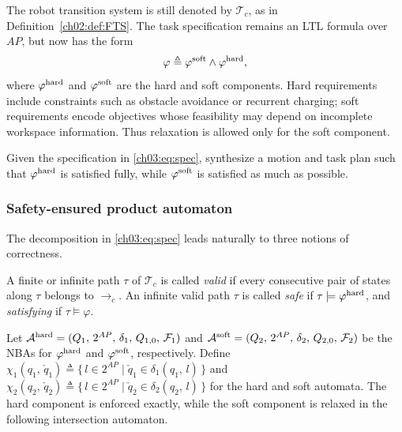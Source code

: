 The robot transition system is still denoted by $\mathcal{T}_c$, as in
Definition~\ref{ch02:def:FTS}. The task specification remains an LTL formula
over $AP$, but now has the form
\begin{equation}
\varphi \triangleq \varphi^{\textup{soft}} \wedge \varphi^{\textup{hard}},
\label{ch03:eq:spec}
\end{equation}
where $\varphi^{\textup{hard}}$ and $\varphi^{\textup{soft}}$ are the hard and
soft components. Hard requirements include constraints such as obstacle
avoidance or recurrent charging; soft requirements encode objectives whose
feasibility may depend on incomplete workspace information. Thus relaxation is
allowed only for the soft component.

\begin{problem}
Given the specification in \eqref{ch03:eq:spec}, synthesize a motion and task
plan such that $\varphi^{\textup{hard}}$ is satisfied fully, while
$\varphi^{\textup{soft}}$ is satisfied as much as possible.
\end{problem}

\subsubsection{Safety-ensured product automaton}
\label{ch03:subsec:intersection}

The decomposition in \eqref{ch03:eq:spec} leads naturally to three notions of
correctness.

\begin{definition}\label{ch03:def:vs}
A finite or infinite path $\tau$ of $\mathcal{T}_c$ is called \emph{valid}
if every consecutive pair of states along $\tau$ belongs to
$\longrightarrow_c$. An infinite valid path $\tau$ is called \emph{safe} if
$\tau \models \varphi^{\textup{hard}}$, and \emph{satisfying} if
$\tau \models \varphi$.
\end{definition}

Let
$\mathcal{A}^{\textup{hard}}
= (Q_1,\, 2^{AP},\, \delta_1,\, Q_{1,0},\, \mathcal{F}_1)$ and
$\mathcal{A}^{\textup{soft}}
= (Q_2,\, 2^{AP},\, \delta_2,\, Q_{2,0},\, \mathcal{F}_2)$ be the NBAs for
$\varphi^{\textup{hard}}$ and $\varphi^{\textup{soft}}$, respectively. Define
$\chi_1(q_1,\, \check{q}_1) \triangleq
\{\, l \in 2^{AP} \mid \check{q}_1 \in \delta_1(q_1,\, l) \,\}$ and
$\chi_2(q_2,\, \check{q}_2) \triangleq
\{\, l \in 2^{AP} \mid \check{q}_2 \in \delta_2(q_2,\, l) \,\}$ for the hard
and soft automata. The hard component is enforced exactly, while the soft
component is relaxed in the following intersection automaton.

